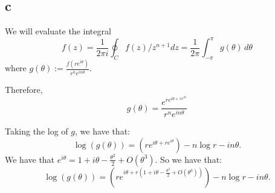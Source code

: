 \documentclass[]{article}
\theoremstyle{definition}
\numberwithin{theorem}{section}
\numberwithin{equation}{section}
\begin{document}
\subsection{c}
We will evaluate the integral 
\begin{equation}
	[z^n] f(z) = \frac{1}{2 \pi i }\oint_C f(z)/z^{n + 1} dz =  \frac{1}{2\pi}\int_{-\pi}^{\pi} g(\theta) \, d\theta
\end{equation}
where $ g(\theta) := \frac{f(r e^{i \theta})}{r^n e^{i n \theta}}$.

Therefore,
\begin{equation}
	g(\theta) = \frac{e^{r e^{i \theta + r e^{i \theta}}}}{r^n e^{i n \theta}}
\end{equation}

Taking the log of $g$, we have that:
\begin{equation}
	\log(g(\theta)) = (r e^{i \theta + r e^{i \theta}}) - n \log r - i n \theta. 
\end{equation}
We have that $e^{i \theta} =  1 + i \theta - \frac{\theta^2}{2} + O(\theta^3)$. So we have that:
\begin{equation}
	\log(g(\theta)) = (r e^{i \theta + r ( 1 + i \theta - \frac{\theta^2}{2} + O(\theta^3))}) - n \log r - i n \theta. 
\end{equation}
\end{document}
